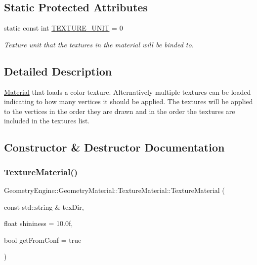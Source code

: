 \subsection*{Static Protected Attributes}
\begin{DoxyCompactItemize}
\item 
\mbox{\label{class_geometry_engine_1_1_geometry_material_1_1_texture_material_a5728fe450875f732ce65025cba6dacb0}} 
static const int \mbox{\hyperlink{class_geometry_engine_1_1_geometry_material_1_1_texture_material_a5728fe450875f732ce65025cba6dacb0}{T\+E\+X\+T\+U\+R\+E\+\_\+\+U\+N\+IT}} = 0
\begin{DoxyCompactList}\small\item\em Texture unit that the textures in the material will be binded to. \end{DoxyCompactList}\end{DoxyCompactItemize}


\subsection{Detailed Description}
\mbox{\hyperlink{class_geometry_engine_1_1_geometry_material_1_1_material}{Material}} that loads a color texture. Alternatively multiple textures can be loaded indicating to how many vertices it should be applied. The textures will be applied to the vertices in the order they are drawn and in the order the textures are included in the textures list. 

\subsection{Constructor \& Destructor Documentation}
\mbox{\label{class_geometry_engine_1_1_geometry_material_1_1_texture_material_a3c928f93c8538111fba4e5985e9ce43e}} 
\subsubsection{\texorpdfstring{TextureMaterial()}{TextureMaterial()}\hspace{0.1cm}{\footnotesize\ttfamily [1/4]}}
{\footnotesize\ttfamily Geometry\+Engine\+::\+Geometry\+Material\+::\+Texture\+Material\+::\+Texture\+Material (\begin{DoxyParamCaption}\item[{const std\+::string \&}]{tex\+Dir,  }\item[{float}]{shininess = {\ttfamily 10.0f},  }\item[{bool}]{get\+From\+Conf = {\ttfamily true} }\end{DoxyParamCaption})}

